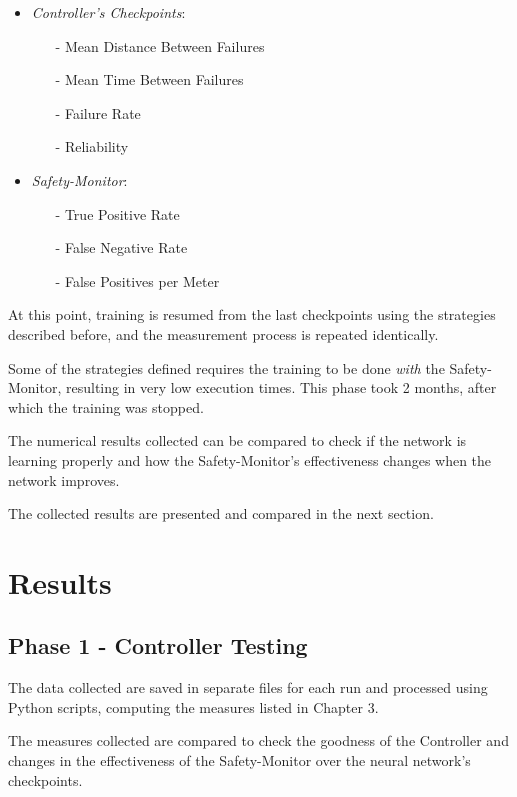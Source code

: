 \begin{itemize}
	\item \textsl{Controller's Checkpoints}:
	\begin{itemize}
		\item[-] Mean Distance Between Failures
		\item[-] Mean Time Between Failures
		\item[-] Failure Rate
		\item[-] Reliability
	\end{itemize}
	\item \textsl{Safety-Monitor}:
	\begin{itemize}
		\item[-] True Positive Rate
		\item[-] False Negative Rate
		\item[-] False Positives per Meter
	\end{itemize}
\end{itemize}

At this point, training is resumed from the last checkpoints using the strategies described before, and the measurement process is repeated identically.

Some of the strategies defined requires the training to be done \textsl{with} the Safety-Monitor, resulting in very low execution times. This phase took 2 months, after which the training was stopped.

The numerical results collected can be compared to check if the network is learning properly and how the Safety-Monitor's effectiveness changes when the network improves.

The collected results are presented and compared in the next section.

\section{Results}

\subsection{Phase 1 - Controller Testing}

The data collected are saved in separate files for each run and processed using Python scripts, computing the measures listed in Chapter 3.

The measures collected are compared to check the goodness of the Controller and changes in the effectiveness of the Safety-Monitor over the neural network's checkpoints.

